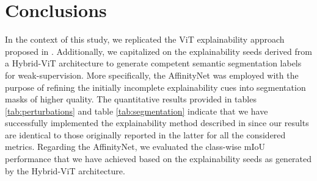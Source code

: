 \documentclass{article}
\begin{document}
\section{Conclusions}





In the context of this study, we replicated the ViT explainability approach proposed in \cite{mainpaper}. Additionally, we capitalized on the explainability seeds derived from a Hybrid-ViT architecture to generate competent semantic segmentation labels for weak-supervision. More specifically, the AffinityNet \cite{ahn2018learning} was employed with the purpose of refining the initially incomplete explainability cues into segmentation masks of higher quality. The quantitative results provided in tables \ref{tab:perturbations} and table \ref{tab:segmentation} indicate that we have successfully implemented the explainability method described in \cite{mainpaper} since our results are identical to those originally reported in the latter for all the considered metrics. Regarding the AffinityNet, we evaluated the class-wise mIoU performance that we have achieved based on the explainability seeds as generated by the Hybrid-ViT architecture. 
\end{document}
